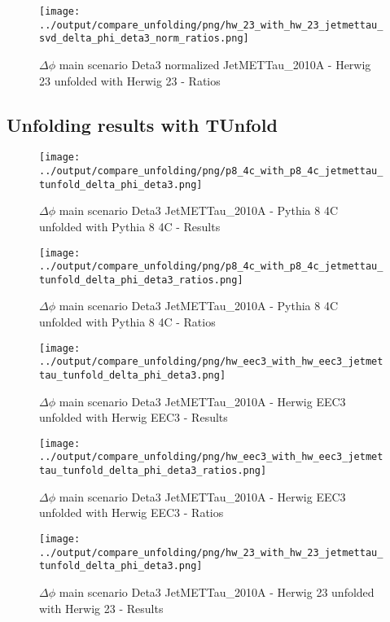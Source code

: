 \documentclass[11pt]{book}
\begin{document}
\begin{figure}[ht]
\centering
\texttt{[image: ../output/compare\_unfolding/png/hw\_23\_with\_hw\_23\_jetmettau\_svd\_delta\_phi\_deta3\_norm\_ratios.png]}
\caption{$\Delta\phi$ main scenario Deta3 normalized JetMETTau\_2010A - Herwig 23 unfolded with Herwig 23 - Ratios}
\label{hw_23_hw_23_jetmettau_svd_delta_phi_deta3_norm_b}
\end{figure}


\clearpage
\subsection{Unfolding results with TUnfold}
\begin{figure}[ht]
\centering
\texttt{[image: ../output/compare\_unfolding/png/p8\_4c\_with\_p8\_4c\_jetmettau\_tunfold\_delta\_phi\_deta3.png]}
\caption{$\Delta\phi$ main scenario Deta3 JetMETTau\_2010A - Pythia 8 4C unfolded with Pythia 8 4C - Results}
\label{p8_p8_jetmettau_tunfold_delta_phi_deta3_a}
\end{figure}

\begin{figure}[ht]
\centering
\texttt{[image: ../output/compare\_unfolding/png/p8\_4c\_with\_p8\_4c\_jetmettau\_tunfold\_delta\_phi\_deta3\_ratios.png]}
\caption{$\Delta\phi$ main scenario Deta3 JetMETTau\_2010A - Pythia 8 4C unfolded with Pythia 8 4C - Ratios}
\label{p8_p8_jetmettau_tunfold_delta_phi_deta3_b}
\end{figure}

\begin{figure}[ht]
\centering
\texttt{[image: ../output/compare\_unfolding/png/hw\_eec3\_with\_hw\_eec3\_jetmettau\_tunfold\_delta\_phi\_deta3.png]}
\caption{$\Delta\phi$ main scenario Deta3 JetMETTau\_2010A - Herwig EEC3 unfolded with Herwig EEC3 - Results}
\label{hw_eec3_hw_eec3_jetmettau_tunfold_delta_phi_deta3_a}
\end{figure}

\begin{figure}[ht]
\centering
\texttt{[image: ../output/compare\_unfolding/png/hw\_eec3\_with\_hw\_eec3\_jetmettau\_tunfold\_delta\_phi\_deta3\_ratios.png]}
\caption{$\Delta\phi$ main scenario Deta3 JetMETTau\_2010A - Herwig EEC3 unfolded with Herwig EEC3 - Ratios}
\label{hw_eec3_hw_eec3_jetmettau_tunfold_delta_phi_deta3_b}
\end{figure}

\begin{figure}[ht]
\centering
\texttt{[image: ../output/compare\_unfolding/png/hw\_23\_with\_hw\_23\_jetmettau\_tunfold\_delta\_phi\_deta3.png]}
\caption{$\Delta\phi$ main scenario Deta3 JetMETTau\_2010A - Herwig 23 unfolded with Herwig 23 - Results}
\label{hw_23_hw_23_jetmettau_tunfold_delta_phi_deta3_a}
\end{figure}
\end{document}
